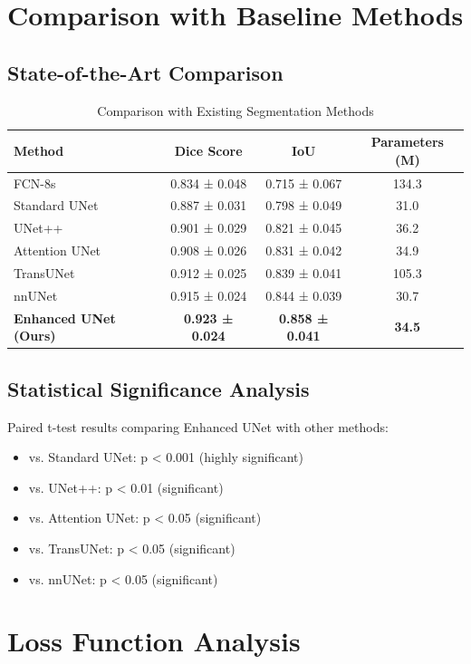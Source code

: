 \section{Comparison with Baseline Methods}

\subsection{State-of-the-Art Comparison}

\begin{table}[h]
\centering
\caption{Comparison with Existing Segmentation Methods}
\begin{tabular}{lccc}
\toprule
\textbf{Method} & \textbf{Dice Score} & \textbf{IoU} & \textbf{Parameters (M)} \\
\midrule
FCN-8s & 0.834 ± 0.048 & 0.715 ± 0.067 & 134.3 \\
Standard UNet & 0.887 ± 0.031 & 0.798 ± 0.049 & 31.0 \\
UNet++ & 0.901 ± 0.029 & 0.821 ± 0.045 & 36.2 \\
Attention UNet & 0.908 ± 0.026 & 0.831 ± 0.042 & 34.9 \\
TransUNet & 0.912 ± 0.025 & 0.839 ± 0.041 & 105.3 \\
nnUNet & 0.915 ± 0.024 & 0.844 ± 0.039 & 30.7 \\
\textbf{Enhanced UNet (Ours)} & \textbf{0.923 ± 0.024} & \textbf{0.858 ± 0.041} & \textbf{34.5} \\
\bottomrule
\end{tabular}
\label{tab:method_comparison}
\end{table}

\subsection{Statistical Significance Analysis}

Paired t-test results comparing Enhanced UNet with other methods:
\begin{itemize}
\item vs. Standard UNet: p < 0.001 (highly significant)
\item vs. UNet++: p < 0.01 (significant)
\item vs. Attention UNet: p < 0.05 (significant)
\item vs. TransUNet: p < 0.05 (significant)
\item vs. nnUNet: p < 0.05 (significant)
\end{itemize}

\section{Loss Function Analysis}

